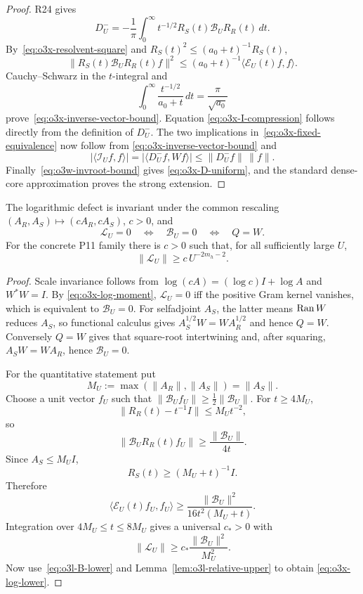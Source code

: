 \begin{proof}
R24 gives
\[
 D_U^-
 =-\frac1\pi\int_0^\infty t^{-1/2}
 R_S(t)\mathscr B_UR_R(t)\,dt.
\]
By~\eqref{eq:o3x-resolvent-square} and
$R_S(t)^2\le(a_0+t)^{-1}R_S(t)$,
\[
 \|R_S(t)\mathscr B_UR_R(t)f\|^2
 \le(a_0+t)^{-1}
 \langle\mathscr E_U(t)f,f\rangle.
\]
Cauchy--Schwarz in the $t$-integral and
\[
 \int_0^\infty\frac{t^{-1/2}}{a_0+t}\,dt
 =\frac\pi{\sqrt{a_0}}
\]
prove~\eqref{eq:o3x-inverse-vector-bound}.  Equation
\eqref{eq:o3x-I-compression} follows directly from the definition of $D_U^-$.
The two implications in~\eqref{eq:o3x-fixed-equivalence} now follow from
\eqref{eq:o3x-inverse-vector-bound} and
\[
 |\langle\mathscr I_Uf,f\rangle|
 =|\langle D_U^-f,Wf\rangle|
 \le\|D_U^-f\|\,\|f\|.
\]
Finally~\eqref{eq:o3w-invroot-bound} gives
\eqref{eq:o3x-D-uniform}, and the standard dense-core approximation proves the strong
extension.
\end{proof}

\begin{proposition}
\label{prop:o3x-log-defect}
The logarithmic defect is invariant under the common rescaling
$(A_R,A_S)\mapsto(cA_R,cA_S)$, $c>0$, and
\[
 \boxed{
 \mathscr L_U=0
 \quad\Longleftrightarrow\quad
 \mathscr B_U=0
 \quad\Longleftrightarrow\quad
 Q=W.
 }
\tag{O3X.13}\label{eq:o3x-log-zero}
\]
For the concrete P11 family there is $c>0$ such that, for all sufficiently large $U$,
\[
 \boxed{
 \|\mathscr L_U\|
 \ge c\,U^{-2m_h-2}.
 }
\tag{O3X.14}\label{eq:o3x-log-lower}
\]
\end{proposition}

\begin{proof}
Scale invariance follows from
$\log(cA)=(\log c)I+\log A$ and $W^*W=I$.  By
\eqref{eq:o3x-log-moment}, $\mathscr L_U=0$ iff the positive Gram kernel vanishes,
which is equivalent to $\mathscr B_U=0$.  For selfadjoint $A_S$, the latter means
$\operatorname{Ran} W$ reduces $A_S$, so functional calculus gives
$A_S^{1/2}W=WA_R^{1/2}$ and hence $Q=W$.  Conversely $Q=W$ gives that square-root
intertwining and, after squaring, $A_SW=WA_R$, hence $\mathscr B_U=0$.

For the quantitative statement put
\[
 M_U:=\max(\|A_R\|,\|A_S\|)=\|A_S\|.
\]
Choose a unit vector $f_U$ such that
$\|\mathscr B_Uf_U\|\ge\frac12\|\mathscr B_U\|$.  For $t\ge4M_U$,
\[
 \|R_R(t)-t^{-1}I\|\le M_Ut^{-2},
\]
so
\[
 \|\mathscr B_UR_R(t)f_U\|
 \ge\frac{\|\mathscr B_U\|}{4t}.
\]
Since $A_S\le M_UI$,
\[
 R_S(t)\ge(M_U+t)^{-1}I.
\]
Therefore
\[
 \langle\mathscr E_U(t)f_U,f_U\rangle
 \ge\frac{\|\mathscr B_U\|^2}{16t^2(M_U+t)}.
\]
Integration over $4M_U\le t\le8M_U$ gives a universal $c_*>0$ with
\[
 \|\mathscr L_U\|
 \ge c_*\frac{\|\mathscr B_U\|^2}{M_U^2}.
\tag{O3X.15}\label{eq:o3x-log-B-lower}
\]
Now use~\eqref{eq:o3l-B-lower} and
Lemma~\ref{lem:o3l-relative-upper} to obtain
\eqref{eq:o3x-log-lower}.
\end{proof}

